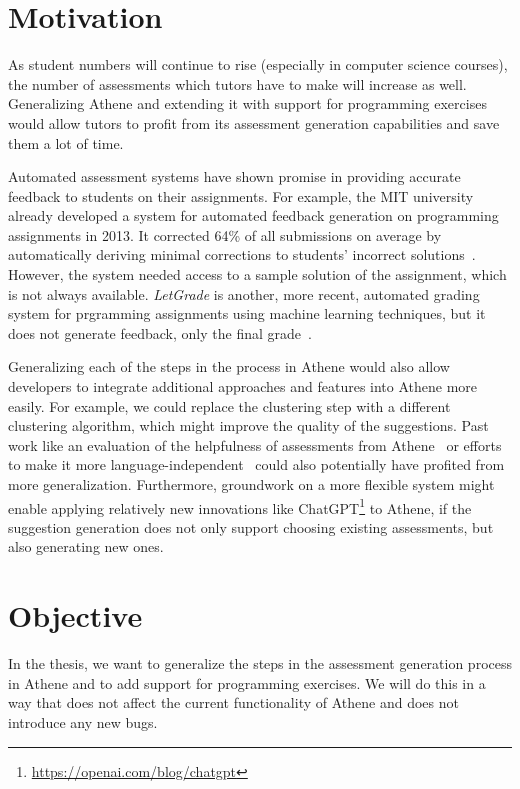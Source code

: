 \section{Motivation}

As student numbers will continue to rise (especially in computer science courses), the number of assessments which tutors have to make will increase as well.
Generalizing Athene and extending it with support for programming exercises would allow tutors to profit from its assessment generation capabilities and save them a lot of time.

Automated assessment systems have shown promise in providing accurate feedback to students on their assignments.
For example, the MIT university already developed a system for automated feedback generation on programming assignments in 2013. It corrected 64\% of all submissions on average by automatically deriving minimal corrections to students' incorrect solutions~\cite{singh2013automated}. However, the system needed access to a sample solution of the assignment, which is not always available. 
\textit{LetGrade} is another, more recent, automated grading system for prgramming assignments using machine learning techniques, but it does not generate feedback, only the final grade~\cite{messer2022grading}.

Generalizing each of the steps in the process in Athene would also allow developers to integrate additional approaches and features into Athene more easily.
For example, we could replace the clustering step with a different clustering algorithm, which might improve the quality of the suggestions. Past work like an evaluation of the helpfulness of assessments from Athene~\cite{atheneTracking} or efforts to make it more language-independent~\cite{atheneLanguage} could also potentially have profited from more generalization.
%
Furthermore, groundwork on a more flexible system might enable applying relatively new innovations like ChatGPT\footnote{\url{https://openai.com/blog/chatgpt}} to Athene, if the suggestion generation does not only support choosing existing assessments, but also generating new ones.

\section{Objective}
In the thesis, we want to generalize the steps in the assessment generation process in Athene and to add support for programming exercises. We will do this in a way that does not affect the current functionality of Athene and does not introduce any new bugs.

